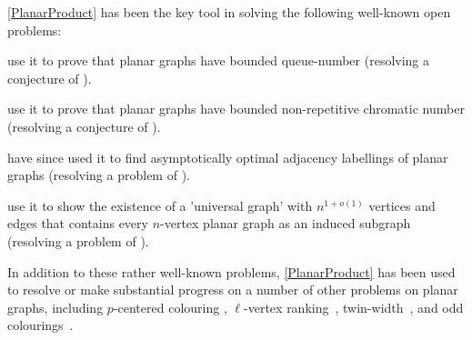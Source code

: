 \documentclass{patmorin}
\theoremstyle{plain}
\theoremstyle{definition}
\begin{document}
\noindent\cref{PlanarProduct} has been the key tool in solving the following well-known open problems:
\begin{compactitem}
\item \citet{DJMMUW20} use it to prove that planar graphs have bounded queue-number (resolving a conjecture of \citet{HLR92}).
\item  \citet{dujmovic.esperet.ea:planar} use it to prove that planar graphs have bounded non-repetitive chromatic number (resolving a conjecture of \citet{AGHR-RSA02}).
\item \citet{DEJGMM21} have since used it to find asymptotically optimal adjacency labellings of planar graphs (resolving a problem of \cite{kannan.naor.ea:implicit}).
\item \citet{EJM} use it to show the existence of a 'universal graph' with $n^{1+o(1)}$ vertices and edges that contains every $n$-vertex planar graph as an induced subgraph (resolving a problem of \citet{babai.chung.ea:on}).
\end{compactitem}
In addition to these rather well-known problems, \cref{PlanarProduct} has been used to resolve or make substantial progress on a number of other problems on planar graphs, including $p$-centered colouring \cite{DFMS21}, $\ell$-vertex ranking~\citep{BDJM}, twin-width~\citep{BKW}, and odd colourings~\citep{DMO}.

\end{document}
